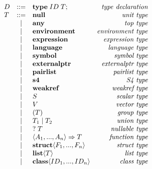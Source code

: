 \documentclass[acmsmall,review,anonymous]{acmart}\settopmatter{printfolios=true,printccs=false,printacmref=false}
\begin{document}
\begin{figure}          %
    \noindent           %
    \centering
    \begin{minipage}{.45\linewidth}
    \begin{flushleft}
      $ \begin{array}{lclr}
    D & ::= & {\bf type} \; ID \; T {\bf ;}  & \text{\it type declaration}\\
    T & ::= & {\bf null} & \text{\it unit type} \\
      & |   & {\bf any} & \text{\it top type} \\
      & |   & {\bf environment} & \text{\it environment type} \\
      & |   & {\bf expression} & \text{\it expression type} \\
      & |   & {\bf language} & \text{\it language type} \\
      & |   & {\bf symbol} & \text{\it symbol type} \\
      & |   & {\bf externalptr} & \text{\it externalptr type} \\
      & |   & {\bf pairlist} & \text{\it pairlist type} \\
      & |   & {\bf s4} & \text{\it S4 type} \\
      & |   & {\bf weakref} & \text{\it weakref type} \\
      & |   & S & \text{\it scalar type} \\
      & |   & V & \text{\it vector type} \\
      & |   & \left( T \right) & \text{\it group type} \\
      & |   & T_1 \; {\bf |} \; T_2 & \text{\it union type} \\
      & |   & ? \; T & \text{\it nullable type} \\
      & |   & \langle A_1 , ..., A_n\rangle \Rightarrow T & \text{\it function type} \\
      & |   & {\bf struct}\langle F_1, ..., F_n \rangle & \text{\it struct type} \\
      & |   & {\bf list} \langle T \rangle & \text{\it list type}\\
      & |   & {\bf class}\langle ID_1, ..., ID_n \rangle & \text{\it class type}\vspace{5pt}\\
    \end{array} $
    \end{flushleft}
    \end{minipage}

\end{figure}
\end{document}
